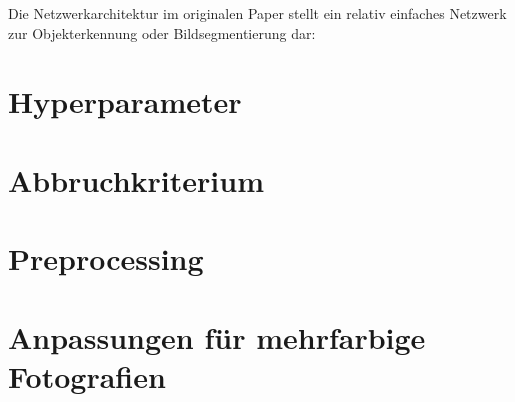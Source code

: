 Die Netzwerkarchitektur im originalen Paper stellt ein relativ einfaches Netzwerk zur Objekterkennung oder Bildsegmentierung dar:

\section{Hyperparameter}
\label{sec:hyperparameter}

\section{Abbruchkriterium}
\label{sec:stoppingcriteria}

\section{Preprocessing}
\label{sec:preprocessing}

\section{Anpassungen für mehrfarbige Fotografien}
\label{sec:referenceimages}